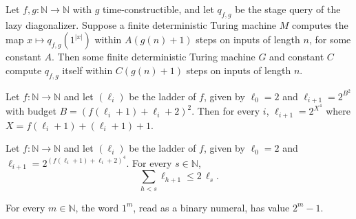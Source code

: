 \begin{theorem}
\label{Turing.NTimeDiag.qy_query_of_main}
\leanok
{}
Let $f, g : \mathbb{N} \to \mathbb{N}$ with $g$ time-constructible, and let $q_{f,g}$ be the stage
query of the lazy diagonalizer. Suppose a finite deterministic Turing machine $M$ computes the
map $x \mapsto q_{f,g}(1^{|x|})$ within $A(g(n) + 1)$ steps on inputs of length $n$, for some
constant $A$. Then some finite deterministic Turing machine $G$ and constant $C$ compute
$q_{f,g}$ itself within $C(g(n) + 1)$ steps on inputs of length $n$.
\end{theorem}

\begin{theorem}
\label{Turing.NTimeDiag.qy_ladder_succ_eq}
\leanok
{}
Let $f : \mathbb{N} \to \mathbb{N}$ and let $(\ell_i)$ be the ladder of $f$, given by
$\ell_0 = 2$ and $\ell_{i+1} = 2^{B^2}$ with budget $B = (f(\ell_i + 1) + \ell_i + 2)^2$. Then for
every $i$, $\ell_{i+1} = 2^{X^4}$ where $X = f(\ell_i + 1) + (\ell_i + 1) + 1$.
\end{theorem}

\begin{theorem}
\label{Turing.NTimeDiag.qy_ledger}
\leanok
{}
Let $f : \mathbb{N} \to \mathbb{N}$ and let $(\ell_i)$ be the ladder of $f$, given by
$\ell_0 = 2$ and $\ell_{i+1} = 2^{(f(\ell_i+1) + \ell_i + 2)^4}$. For every $s \in \mathbb{N}$,
\[ \sum_{h < s} \ell_{h+1} \le 2\,\ell_s. \]
\end{theorem}

\begin{theorem}
\label{Turing.NTimeDiag.qy_ones_val}
\leanok
{}
For every $m \in \mathbb{N}$, the word $1^m$, read as a binary numeral, has value $2^m - 1$.
\end{theorem}

